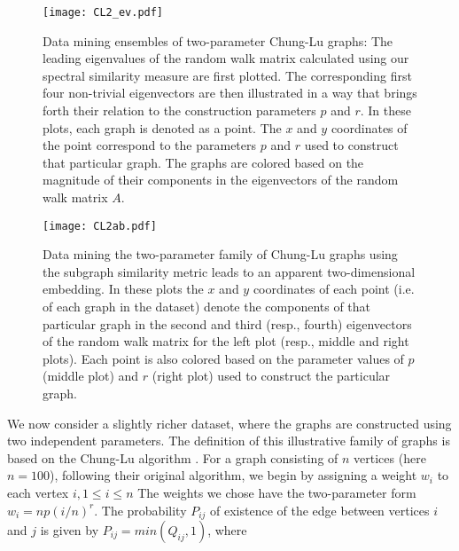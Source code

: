 \begin{figure}
  \begin{center}
    \texttt{[image: CL2\_ev.pdf]}
    \caption{\label{fig:CL2} Data mining ensembles of two-parameter
      Chung-Lu graphs: The leading eigenvalues of the random walk
      matrix calculated using our spectral similarity measure are
      first plotted.  The corresponding first four non-trivial
      eigenvectors are then illustrated in a way that brings forth
      their relation to the construction parameters $p$ and $r$.  In
      these plots, each graph is denoted as a point.  The $x$ and $y$
      coordinates of the point correspond to the parameters $p$ and
      $r$ used to construct that particular graph.  The graphs are
      colored based on the magnitude of their components in the
      eigenvectors of the random walk matrix $A$.  }
  \end{center}
\end{figure}

\begin{figure}
  \begin{center}
    \texttt{[image: CL2ab.pdf]}
    \caption{\label{fig:CL2ab} Data mining the two-parameter family of Chung-Lu graphs using the subgraph similarity metric
      leads to an apparent two-dimensional
      embedding.
      In these plots the $x$ and $y$ coordinates of each point (i.e. of each graph in the dataset)
      denote the components of that particular graph in the second and third (resp., fourth) eigenvectors of the random walk matrix
      for the left plot (resp., middle and right plots).
      Each point is also colored based on the parameter values of $p$
      (middle plot) and $r$ (right plot) used to construct the
      particular graph.  }
  \end{center}
\end{figure}

We now consider a slightly richer dataset, where the graphs are
constructed using two independent parameters.
% 
The definition of this illustrative family of graphs is based on the
Chung-Lu algorithm \cite{Chun02connected}.
% 
For a graph consisting of $n$ vertices (here $n=100$), following their
original algorithm, we begin by assigning a weight $w_i$ to each
vertex $i, 1 \leq i \leq n$
% 
The weights we chose have the two-parameter form $w_i = np(i/n)^r$.
% 
The probability $P_{ij}$ of existence of the edge between vertices $i$
and $j$ is given by $P_{ij}=min(Q_{ij},1)$, where

